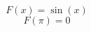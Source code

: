 \documentclass{article}
\begin{document}
\begin{equation} F(x) = \sin(x) \end{equation}
\begin{equation} F(\pi) = 0 \end{equation}
\end{document}

